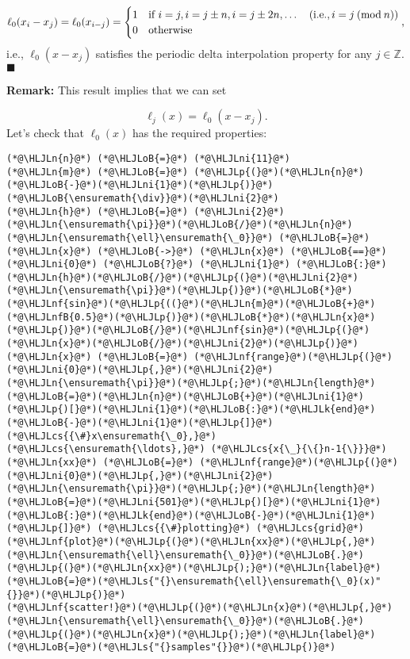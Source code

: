 \documentclass[12pt,landscape]{article}
\newcommand{\HLJLk}[1]{\textcolor[RGB]{148,91,176}{\textbf{#1}}}
\newcommand{\HLJLn}[1]{#1}
\newcommand{\HLJLnf}[1]{\textcolor[RGB]{66,102,213}{#1}}
\newcommand{\HLJLs}[1]{\textcolor[RGB]{201,61,57}{#1}}
\newcommand{\HLJLnfB}[1]{\textcolor[RGB]{59,151,46}{#1}}
\newcommand{\HLJLni}[1]{\textcolor[RGB]{59,151,46}{#1}}
\newcommand{\HLJLoB}[1]{\textcolor[RGB]{102,102,102}{\textbf{#1}}}
\newcommand{\HLJLp}[1]{#1}
\newcommand{\HLJLcs}[1]{\textcolor[RGB]{153,153,119}{\textit{#1}}}
\begin{document}
{\[
\ell_{0}(x_i - x_j) = \ell_{0}(x_{i-j})  =  \begin{cases}
1 & \text{if } i = j, i = j \pm n, i = j\pm 2n, \ldots \quad (\text{i.e.}, i = j\: ({\rm mod}\: n))  \\
0 & \text{otherwise } 
\end{cases},
\]
i.e., $\ell_{0}(x - x_j)$ satisfies the periodic delta interpolation property for any $j \in \mathbb{Z}$.  $\blacksquare$

\textbf{Remark:} This result implies that we can set

\[
\ell_j(x) = \ell_0(x - x_j).
\]
Let's check that $\ell_0(x)$ has the required properties:


\begin{lstlisting}
(*@\HLJLn{n}@*) (*@\HLJLoB{=}@*) (*@\HLJLni{11}@*)
(*@\HLJLn{m}@*) (*@\HLJLoB{=}@*) (*@\HLJLp{(}@*)(*@\HLJLn{n}@*)(*@\HLJLoB{-}@*)(*@\HLJLni{1}@*)(*@\HLJLp{)}@*)(*@\HLJLoB{\ensuremath{\div}}@*)(*@\HLJLni{2}@*)
(*@\HLJLn{h}@*) (*@\HLJLoB{=}@*) (*@\HLJLni{2}@*)(*@\HLJLn{\ensuremath{\pi}}@*)(*@\HLJLoB{/}@*)(*@\HLJLn{n}@*)
(*@\HLJLn{\ensuremath{\ell}\ensuremath{\_0}}@*) (*@\HLJLoB{=}@*) (*@\HLJLn{x}@*) (*@\HLJLoB{->}@*) (*@\HLJLn{x}@*) (*@\HLJLoB{==}@*) (*@\HLJLni{0}@*) (*@\HLJLoB{?}@*) (*@\HLJLni{1}@*) (*@\HLJLoB{:}@*) (*@\HLJLn{h}@*)(*@\HLJLoB{/}@*)(*@\HLJLp{(}@*)(*@\HLJLni{2}@*)(*@\HLJLn{\ensuremath{\pi}}@*)(*@\HLJLp{)}@*)(*@\HLJLoB{*}@*)(*@\HLJLnf{sin}@*)(*@\HLJLp{((}@*)(*@\HLJLn{m}@*)(*@\HLJLoB{+}@*)(*@\HLJLnfB{0.5}@*)(*@\HLJLp{)}@*)(*@\HLJLoB{*}@*)(*@\HLJLn{x}@*)(*@\HLJLp{)}@*)(*@\HLJLoB{/}@*)(*@\HLJLnf{sin}@*)(*@\HLJLp{(}@*)(*@\HLJLn{x}@*)(*@\HLJLoB{/}@*)(*@\HLJLni{2}@*)(*@\HLJLp{)}@*)
(*@\HLJLn{x}@*) (*@\HLJLoB{=}@*) (*@\HLJLnf{range}@*)(*@\HLJLp{(}@*)(*@\HLJLni{0}@*)(*@\HLJLp{,}@*)(*@\HLJLni{2}@*)(*@\HLJLn{\ensuremath{\pi}}@*)(*@\HLJLp{;}@*)(*@\HLJLn{length}@*)(*@\HLJLoB{=}@*)(*@\HLJLn{n}@*)(*@\HLJLoB{+}@*)(*@\HLJLni{1}@*)(*@\HLJLp{)[}@*)(*@\HLJLni{1}@*)(*@\HLJLoB{:}@*)(*@\HLJLk{end}@*)(*@\HLJLoB{-}@*)(*@\HLJLni{1}@*)(*@\HLJLp{]}@*) (*@\HLJLcs{{\#}x\ensuremath{\_0},}@*) (*@\HLJLcs{\ensuremath{\ldots},}@*) (*@\HLJLcs{x{\_}{\{}n-1{\}}}@*)
(*@\HLJLn{xx}@*) (*@\HLJLoB{=}@*) (*@\HLJLnf{range}@*)(*@\HLJLp{(}@*)(*@\HLJLni{0}@*)(*@\HLJLp{,}@*)(*@\HLJLni{2}@*)(*@\HLJLn{\ensuremath{\pi}}@*)(*@\HLJLp{;}@*)(*@\HLJLn{length}@*)(*@\HLJLoB{=}@*)(*@\HLJLni{501}@*)(*@\HLJLp{)[}@*)(*@\HLJLni{1}@*)(*@\HLJLoB{:}@*)(*@\HLJLk{end}@*)(*@\HLJLoB{-}@*)(*@\HLJLni{1}@*)(*@\HLJLp{]}@*) (*@\HLJLcs{{\#}plotting}@*) (*@\HLJLcs{grid}@*)
(*@\HLJLnf{plot}@*)(*@\HLJLp{(}@*)(*@\HLJLn{xx}@*)(*@\HLJLp{,}@*)(*@\HLJLn{\ensuremath{\ell}\ensuremath{\_0}}@*)(*@\HLJLoB{.}@*)(*@\HLJLp{(}@*)(*@\HLJLn{xx}@*)(*@\HLJLp{);}@*)(*@\HLJLn{label}@*)(*@\HLJLoB{=}@*)(*@\HLJLs{"{}\ensuremath{\ell}\ensuremath{\_0}(x)"{}}@*)(*@\HLJLp{)}@*)
(*@\HLJLnf{scatter!}@*)(*@\HLJLp{(}@*)(*@\HLJLn{x}@*)(*@\HLJLp{,}@*)(*@\HLJLn{\ensuremath{\ell}\ensuremath{\_0}}@*)(*@\HLJLoB{.}@*)(*@\HLJLp{(}@*)(*@\HLJLn{x}@*)(*@\HLJLp{);}@*)(*@\HLJLn{label}@*)(*@\HLJLoB{=}@*)(*@\HLJLs{"{}samples"{}}@*)(*@\HLJLp{)}@*)
\end{lstlisting}

}
\end{document}
